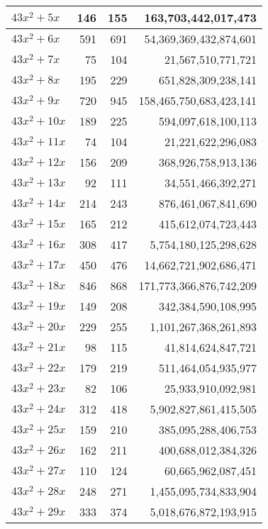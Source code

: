 \documentclass[a4paper]{amsproc}
\theoremstyle{plain}
\theoremstyle{named}
\begin{document}
\begin{longtable}{ | l | r | r | r | }
$43x^2 + 5x$ & 146 & 155 & 163{,}703{,}442{,}017{,}473 \\ \hline
$43x^2 + 6x$ & 591 & 691 & 54{,}369{,}369{,}432{,}874{,}601 \\ \hline
$43x^2 + 7x$ & 75 & 104 & 21{,}567{,}510{,}771{,}721 \\ \hline
$43x^2 + 8x$ & 195 & 229 & 651{,}828{,}309{,}238{,}141 \\ \hline
$43x^2 + 9x$ & 720 & 945 & 158{,}465{,}750{,}683{,}423{,}141 \\ \hline
$43x^2 + 10x$ & 189 & 225 & 594{,}097{,}618{,}100{,}113 \\ \hline
$43x^2 + 11x$ & 74 & 104 & 21{,}221{,}622{,}296{,}083 \\ \hline
$43x^2 + 12x$ & 156 & 209 & 368{,}926{,}758{,}913{,}136 \\ \hline
$43x^2 + 13x$ & 92 & 111 & 34{,}551{,}466{,}392{,}271 \\ \hline
$43x^2 + 14x$ & 214 & 243 & 876{,}461{,}067{,}841{,}690 \\ \hline
$43x^2 + 15x$ & 165 & 212 & 415{,}612{,}074{,}723{,}443 \\ \hline
$43x^2 + 16x$ & 308 & 417 & 5{,}754{,}180{,}125{,}298{,}628 \\ \hline
$43x^2 + 17x$ & 450 & 476 & 14{,}662{,}721{,}902{,}686{,}471 \\ \hline
$43x^2 + 18x$ & 846 & 868 & 171{,}773{,}366{,}876{,}742{,}209 \\ \hline
$43x^2 + 19x$ & 149 & 208 & 342{,}384{,}590{,}108{,}995 \\ \hline
$43x^2 + 20x$ & 229 & 255 & 1{,}101{,}267{,}368{,}261{,}893 \\ \hline
$43x^2 + 21x$ & 98 & 115 & 41{,}814{,}624{,}847{,}721 \\ \hline
$43x^2 + 22x$ & 179 & 219 & 511{,}464{,}054{,}935{,}977 \\ \hline
$43x^2 + 23x$ & 82 & 106 & 25{,}933{,}910{,}092{,}981 \\ \hline
$43x^2 + 24x$ & 312 & 418 & 5{,}902{,}827{,}861{,}415{,}505 \\ \hline
$43x^2 + 25x$ & 159 & 210 & 385{,}095{,}288{,}406{,}753 \\ \hline
$43x^2 + 26x$ & 162 & 211 & 400{,}688{,}012{,}384{,}326 \\ \hline
$43x^2 + 27x$ & 110 & 124 & 60{,}665{,}962{,}087{,}451 \\ \hline
$43x^2 + 28x$ & 248 & 271 & 1{,}455{,}095{,}734{,}833{,}904 \\ \hline
$43x^2 + 29x$ & 333 & 374 & 5{,}018{,}676{,}872{,}193{,}915 \\ \hline

\end{longtable}
\end{document}
